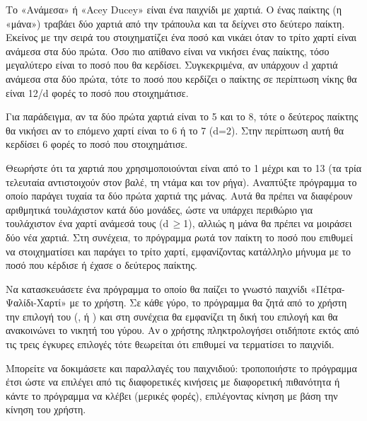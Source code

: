 \documentclass[a4paper,11pt,oneside]{book}
\begin{document}
\begin{exercise}
Το «Ανάμεσα» ή «Acey Ducey» είναι ένα παιχνίδι με χαρτιά. Ο ένας παίκτης (η «μάνα») τραβάει δύο χαρτιά από την τράπουλα και τα δείχνει στο δεύτερο παίκτη. Εκείνος με την σειρά του στοιχηματίζει ένα ποσό και νικάει όταν το τρίτο χαρτί είναι ανάμεσα στα δύο πρώτα. Όσο πιο απίθανο είναι να νικήσει ένας παίκτης, τόσο μεγαλύτερο είναι το ποσό που θα κερδίσει. Συγκεκριμένα, αν υπάρχουν d χαρτιά ανάμεσα στα δύο πρώτα, τότε το ποσό που κερδίζει ο παίκτης σε περίπτωση νίκης θα είναι 12/d φορές το ποσό που στοιχημάτισε.

\begin{note}
Για παράδειγμα, αν τα δύο πρώτα χαρτιά είναι το 5 και το 8, τότε ο δεύτερος παίκτης θα νικήσει αν το επόμενο χαρτί είναι το 6 ή το 7 (d=2). Στην περίπτωση αυτή θα κερδίσει 6 φορές το ποσό που στοιχημάτισε.
\end{note}

Θεωρήστε ότι τα χαρτιά που χρησιμοποιούνται είναι από το 1 μέχρι και το 13 (τα τρία τελευταία αντιστοιχούν στον βαλέ, τη ντάμα και τον ρήγα). Αναπτύξτε πρόγραμμα το οποίο παράγει τυχαία τα δύο πρώτα χαρτιά της μάνας. Αυτά θα πρέπει να διαφέρουν αριθμητικά τουλάχιστον κατά δύο μονάδες, ώστε να υπάρχει περιθώριο για τουλάχιστον ένα χαρτί ανάμεσά τους (d\,$\geq$1), αλλιώς η μάνα θα πρέπει να μοιράσει δύο νέα χαρτιά. Στη συνέχεια, το πρόγραμμα ρωτά τον παίκτη το ποσό που επιθυμεί να στοιχηματίσει και παράγει το τρίτο χαρτί, εμφανίζοντας κατάλληλο μήνυμα με το ποσό που κέρδισε ή έχασε ο δεύτερος παίκτης.
\end{exercise}

\begin{exercise}
Να κατασκευάσετε ένα πρόγραμμα το οποίο θα παίζει το γνωστό παιχνίδι «Πέτρα-Ψαλίδι-Χαρτί» με το χρήστη. Σε κάθε γύρο, το πρόγραμμα θα ζητά από το χρήστη την επιλογή του (\textup{}, \textup{} ή \textup{}) και στη συνέχεια θα εμφανίζει τη δική του επιλογή και θα ανακοινώνει το νικητή του γύρου. Αν ο χρήστης πληκτρολογήσει οτιδήποτε εκτός από τις τρεις έγκυρες επιλογές τότε θεωρείται ότι επιθυμεί να τερματίσει το παιχνίδι. 

Μπορείτε να δοκιμάσετε και παραλλαγές του παιχνιδιού: τροποποιήστε το πρόγραμμα έτσι ώστε να επιλέγει από τις διαφορετικές κινήσεις με διαφορετική πιθανότητα ή κάντε το πρόγραμμα να κλέβει (μερικές φορές), επιλέγοντας κίνηση με βάση την κίνηση του χρήστη.
\end{exercise}
\end{document}
